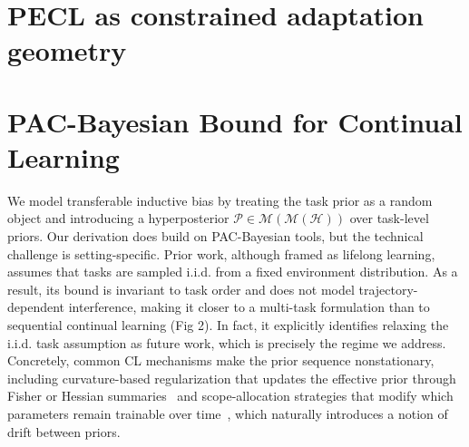 \documentclass[10pt]{article} %
\begin{document}




\section{PECL as constrained adaptation geometry}


\section{PAC-Bayesian Bound for Continual Learning}
\label{sec:single_to_cl}

We model transferable inductive bias by treating the task prior as a random object and introducing a hyperposterior $\mathcal P\in\mathcal M(\mathcal M(\mathcal H))$ over task-level priors. Our derivation does build on PAC-Bayesian tools, but the technical challenge is setting-specific. Prior work\cite{pentinaPACBayesianBoundLifelong2014}, although framed as lifelong learning, assumes that tasks are sampled i.i.d. from a fixed environment distribution. As a result, its bound is invariant to task order and does not model trajectory-dependent interference, making it closer to a multi-task formulation than to sequential continual learning (Fig 2). In fact, it\cite{pentinaPACBayesianBoundLifelong2014} explicitly identifies relaxing the i.i.d. task assumption as future work, which is precisely the regime we address. Concretely, common CL mechanisms make the prior sequence nonstationary, including curvature-based regularization that updates the effective prior through Fisher or Hessian summaries~\citep{EWC2017,SI2017} and scope-allocation strategies that modify which parameters remain trainable over time~\citep{progressive2016,HAT2018,Supermasks2020,pmlr-v97-houlsby19a}, which naturally introduces a notion of drift between priors.
\end{document}
